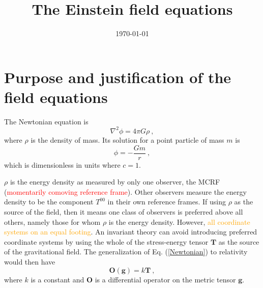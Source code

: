 \documentclass[12pt,a4paper]{article}
\title{The Einstein field equations}
\author{}
\date{\today}
\newcounter{theo}[section]\setcounter{theo}{0}
\begin{document}
\maketitle
\section{Purpose and justification of the field equations}
\cite{2009fcgr.book.....S} The Newtonian equation is
\begin{equation}
\nabla^2 \phi = 4\pi G\rho ~,
\label{Newtonian}
\end{equation}
where $\rho$ is the density of mass. Its solution for a point particle of mass $m$ is
\begin{equation}
\phi = -\frac{Gm}{r} ~,
\end{equation}
which is dimensionless in units where $c = 1$.

$\rho$ is the energy density as measured by only one observer, the MCRF (\textcolor{red}{momentarily comoving reference frame}). Other observers measure the energy density to be the component $T^{00}$ in their own reference frames. If using $\rho$ as the source of the field, then it means one class of observers is preferred above all others, namely those for whom $\rho$ is the energy density. However, \textcolor{orange}{all coordinate systems on an equal footing}. An invariant theory can avoid introducing preferred coordinate systems by using the whole of the stress-energy tensor $\textbf{T}$ as the source of the gravitational field. The generalization of Eq. (\ref{Newtonian}) to relativity would then have 
\begin{equation}
\textbf{O}(\textbf{g}) = k \textbf{T} ~,
\end{equation}
where $k$ is a constant and $\textbf{O}$ is a differential operator on the metric tensor $\textbf{g}$.
\end{document}
